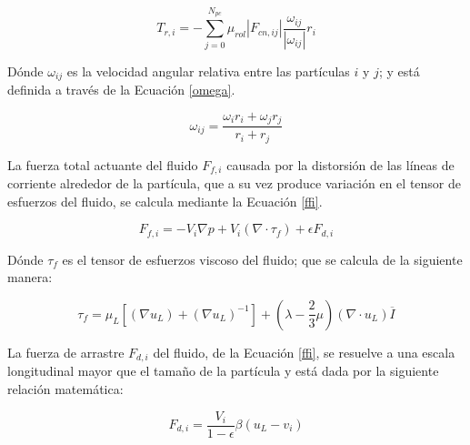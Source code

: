 \begin{equation}
	T_{r,i} = - \sum _{j=0} ^{N_{pc}} \mu _{rol}  \left|F_{cn, ij} \right| \frac{\omega _{ij}}{\left| \omega _{ij} \right|} r_i
	\label{rolling}
\end{equation}

\noindent
\justify

D\'onde $\omega _{ij}$ es la velocidad angular relativa entre las part\'iculas $i$ y $j$; y est\'a definida a trav\'es de la Ecuaci\'on \ref{omega}.

\begin{equation}
	\omega _{ij} = \frac{\omega _i r_i + \omega _j r_j}{r_i + r_j}
	\label{omega}
\end{equation}

\noindent
\justify

La fuerza total actuante del fluido $F_{f,i}$ causada por la distorsi\'on de las l\'ineas de corriente alrededor de la part\'icula, que a su vez produce variaci\'on en el tensor de esfuerzos del fluido, se calcula mediante la Ecuaci\'on \ref{ffi}.

\begin{equation}
	F_{f,i} = - V_i \nabla p + V_i \left( \nabla \cdot \tau _f \right) + \epsilon F_{d,i}
	\label{ffi}
\end{equation}

\noindent
\justify

D\'onde $\tau _f$ es el tensor de esfuerzos viscoso del fluido; que se calcula de la siguiente manera:

\begin{equation}
	\tau _f = \mu _L \left[ \left( \nabla u_L \right) + \left( \nabla u_L \right) ^{-1} \right] + \left(\lambda - \frac{2}{3} \mu \right) \left( \nabla \cdot u_L \right) \overline{I}
\end{equation}

\noindent
\justify

La fuerza de arrastre $F_{d,i}$ del fluido, de la Ecuaci\'on \ref{ffi}, se resuelve a una escala longitudinal mayor que el tama\~no de la part\'icula y est\'a dada por la siguiente relaci\'on matem\'atica:

\begin{equation}
	F_{d,i} = \frac{V_i}{1 - \epsilon} \beta \left( u_L - v_i \right)
\end{equation}